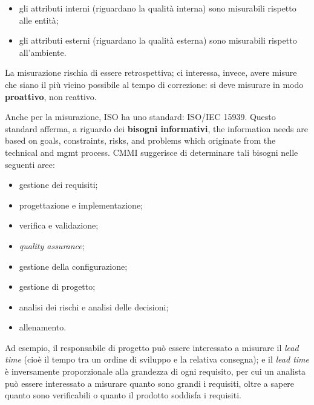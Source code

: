 \documentclass[a4paper]{article}
\begin{document}
	\begin{itemize}
		
			
	\item gli attributi interni (riguardano la qualità interna) sono misurabili rispetto alle entità;
			
	\item gli attributi esterni (riguardano la qualità esterna) sono misurabili rispetto all'ambiente.
		
	\end{itemize}

		
La misurazione rischia di essere retrospettiva; ci interessa, invece, avere misure che siano il più vicino possibile al tempo di correzione: si deve misurare in modo \textbf{proattivo}, non reattivo.
		
Anche per la misurazione, ISO ha uno standard: ISO/IEC 15939. Questo standard afferma, a riguardo dei \textbf{bisogni informativi}, the information needs are based on goals, constraints, risks, and problems which originate from the technical and mgmt process. CMMI suggerisce di determinare tali bisogni nelle seguenti aree:
		
	\begin{itemize}
		
			
	\item gestione dei requisiti;
			
	\item progettazione e implementazione;
			
	\item verifica e validazione;
			
	\item \emph{quality assurance};
			
	\item gestione della configurazione;
			
	\item gestione di progetto;
			
	\item analisi dei rischi e analisi delle decisioni;
			
	\item allenamento.
		
	\end{itemize}

		
Ad esempio, il responsabile di progetto può essere interessato a misurare il \emph{lead time} (cioè il tempo tra un ordine di sviluppo e la relativa consegna); e il \emph{lead time} è inversamente proporzionale alla grandezza di ogni requisito, per cui un analista può essere interessato a misurare quanto sono grandi i requisiti, oltre a sapere quanto sono verificabili o quanto il prodotto soddisfa i requisiti.
		
\end{document}
